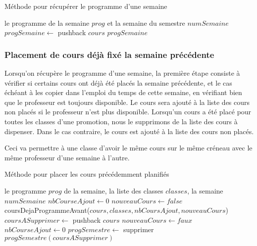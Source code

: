\begin{algorithm}
\caption{Méthode pour récupérer le programme d'une semaine}
\begin{algorithmic}
\REQUIRE le programme de la semaine $prog$ et la semaine du semestre $numSemaine$
\STATE $progSemaine \leftarrow$ pushback $cours$
\ENDIF
\ENDFOR
\RETURN $progSemaine$
\end{algorithmic}
\end{algorithm}

\subsubsection{Placement de cours déjà fixé la semaine précédente}

Lorsqu'on récupère le programme d'une semaine, la première étape consiste à vérifier si certains cours ont déjà été placés la semaine précédente, et le cas échéant à les copier dans l'emploi du temps de cette semaine, en vérifiant bien que le professeur est toujours disponible. Le cours sera ajouté à la liste des cours non placés si le professeur n'est plus disponible. Lorsqu'un cours a été placé pour toutes les classes d'une promotion, nous le supprimons de la liste des cours à dispenser. Dans le cas contraire, le cours est ajouté à la liste des cours non placés.

Ceci va permettre à une classe d'avoir le même cours sur le même créneau avec le même professeur d'une semaine à l'autre.

\begin{algorithm}
\caption{Méthode pour placer les cours précédemment planifiés}
\begin{algorithmic}
\REQUIRE le programme $prog$ de la semaine, la liste des classes $classes$, la semaine $numSemaine$
\STATE $nbCourseAjout \leftarrow 0$
\STATE $nouveauCours \leftarrow false$
\STATE coursDejaProgrammeAvant($cours, classes, nbCoursAjout, nouveauCours$)
\STATE $coursASupprimer \leftarrow$ pushback $cours$
\ELSE 
\STATE $nouveauCours \leftarrow faux$
\ENDIF
\STATE $nbCourseAjout \leftarrow 0$
\ENDFOR
{}
\STATE $progSemestre \leftarrow$ supprimer $progSemestre(coursASupprimer)$
\ENDFOR
\ENDIF
\end{algorithmic}
\end{algorithm}


